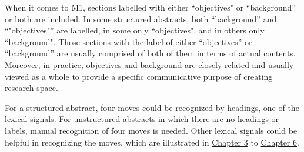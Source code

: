 \documentclass{ctexbook}
\begin{document}
When it comes to M1, sections labelled with either ``objectives" or ``background'' or both are included. In some structured abstracts, both ``background'' and ``"objectives"'' are labelled, in some only ``objectives", and in others only ``background". Those sections with the label of either ``objectives'' or ``background'' are usually comprised of both of them in terms of actual contents. Moreover, in practice, objectives and background are closely related and usually viewed as a whole to provide a specific communicative purpose of creating research space.

For a structured abstract, four moves could be recognized by headings, one of the lexical signals. For unstructured abstracts in which there are no headings or labels, manual recognition of four moves is needed. Other lexical signals could be helpful in recognizing the moves, which are illustrated in \hyperref[chapter3]{Chapter 3} to \hyperref[chapter6]{Chapter 6}.
\end{document}
